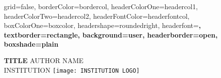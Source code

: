 \documentclass[a0paper,portrait]{baposter}%
\begin{document}
\begin{poster}{grid=false, borderColor=bordercol, headerColorOne=headercol1, headerColorTwo=headercol2, headerFontColor=headerfontcol, boxColorOne=boxcolor, headershape=roundedright, headerfont=\Large\sf\bf, textborder=rectangle, background=user, headerborder=open, boxshade=plain}{}

%
{\sf\bf TITLE}
{AUTHOR NAME\\
INSTITUTION}
{\texttt{[image: INSTITUTION LOGO]}}




\end{poster}
\end{document}

